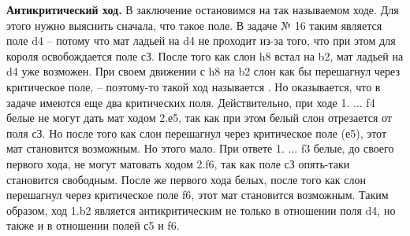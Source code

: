 \textbf{Антикритический ход.} В заключение остановимся на так называемом  ходе. Для этого нужно выяснить сначала, что такое  поле. В задаче № 16 таким является поле d4 -- потому что мат ладьей на d4 не проходит из-за того, что при этом для короля освобождается поле сЗ. После того как слон h8 встал на b2, мат ладьей на d4 уже возможен. При своем движении с h8 на b2 слон как бы перешагнул через критическое поле, -- поэтому-то такой ход называется . Но оказывается, что в задаче имеются еще два критических поля. Действительно, при ходе 1. ... \rook{}f4 белые не могут дать мат ходом 2.\knight{}е5\mate, так как при этом белый слон отрезается от поля сЗ. Но после того как слон перешагнул через критическое поле (е5), этот мат становится возможным. Но этого мало. При ответе 1. ... \knight{}f3 белые, до своего первого хода, не могут матовать ходом 2.f6\mate, так как поле сЗ опять-таки становится свободным. После же первого хода белых, после того как слон перешагнул через критическое поле f6, этот мат становится возможным. Таким образом, ход 1.\bishop{}b2 является антикритическим не только в отношении поля d4, но также и в отношении полей с5 и f6.
